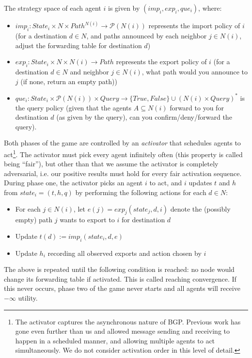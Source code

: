 \documentclass[12pt]{article}
\begin{document}
  The strategy space of each agent $i$ is given by $(imp_i, exp_i, que_i)$, where:
  \begin{itemize}
    \item $imp_i : State_i \times N \times Path^{N(i)} \to 
      \mathcal P(N(i))$ represents the 
      import policy of $i$ (for a destination $d\in N$, and paths announced by each
      neighbor $j\in N(i)$, adjust the forwarding table for destination $d$)
    \item $exp_i : State_i \times N \times N(i) \to Path$ represents
      the export policy of $i$ (for a destination $d\in N$ and neighbor $j\in N(i)$,
      what path would you announce to $j$ (if none, return an empty path))
    \item $que_i : State_i \times \mathcal P (N(i)) \times Query
      \to \{True, False\} \cup (N(i)\times Query)^*$ is the query policy
      (given that the agents $A\subseteq N(i)$ forward to you for destination
      $d$ (as given by the query), can you confirm/deny/forward the query).
  \end{itemize}

  Both phases of the game are controlled by an \emph{activator}
  that schedules agents to act\footnote{
    The activator captures the asynchronous nature of BGP.
    Previous work \cite{PolicyPathVector, RoutingGames} has gone
    even further than us and allowed message
    sending and receiving to happen in a scheduled manner,
    and allowing multiple agents to act simultaneously.
    We do not consider activation order in this level of detail.
  }. The activator must pick every agent infinitely often
  (this property is called being ``fair''),
  but other than that we assume the activator is completely adversarial,
  i.e. our positive results must hold for every fair activation sequence.
  During phase one, the activator picks an agent $i$ to act,
  and $i$ updates $t$ and $h$ from
  $state_i=(t,h,q)$ by performing the following actions
  for each $d\in N$:
  \begin{itemize}
    \item For each $j\in N(i)$, let $e(j) = exp_j(state_j, d, i)$
      denote the (possibly empty) path $j$ wants to export to $i$
      for destination $d$
    \item Update $t(d) := imp_i(state_i, d, e)$
    \item Update $h_i$ recording all observed exports and action chosen by $i$
  \end{itemize}
  The above is repeated until the following condition is reached:
  no node would change its forwarding table if activated.
  This is called reaching convergence.
  If this never occurs, phase two of the game never starts and all agents
  will receive $-\infty$ utility.
\end{document}

